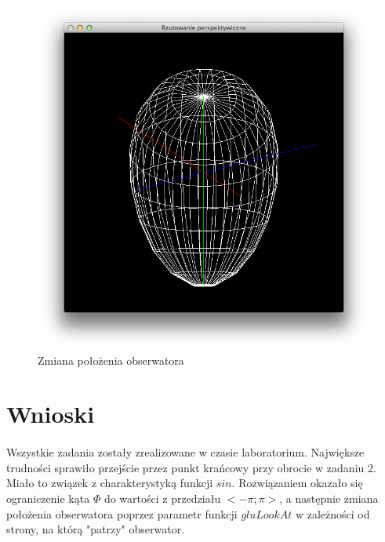 \documentclass[wide,a4paper,titlepage,12pt] {article}
\begin{document}
  \begin{figure}[h!]
    \begin{center}
      \includegraphics[width=\textwidth]{2.png}
      \caption{Zmiana położenia obserwatora}
    \end{center}
  \end{figure}

  \section{Wnioski}
  \paragraph{}
  Wszystkie zadania zostały zrealizowane w czasie laboratorium. Największe trudności sprawiło przejście przez punkt krańcowy przy obrocie w zadaniu 2. Miało to związek z charakterystyką funkcji $sin$. Rozwiązaniem okazało się ograniczenie kąta $\Phi$ do wartości z przedziału $<-\pi ; \pi>$, a następnie zmiana położenia obserwatora poprzez parametr funkcji $gluLookAt$ w zależności od strony, na którą "patrzy" obserwator.
\end{document}
